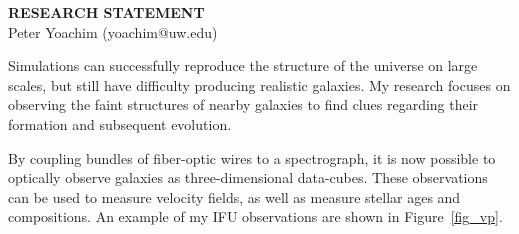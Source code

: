 \documentclass[letterpaper, 11pt]{article}
\begin{document}
\thispagestyle{fancy}
\lhead{}
\rhead{}
\renewcommand{\headrulewidth}{0pt} 
\renewcommand{\footrulewidth}{0pt} 
\fancyfoot[C]{\footnotesize \textcolor{gray}{http://staff.washington.edu/yoachim/}} 


\pagestyle{fancy}
\lhead{\textcolor{gray}{\it Peter Yoachim}}
\rhead{\textcolor{gray}{\thepage/\totalpages{}}}


\begin{center}
{\Large \bf RESEARCH STATEMENT}\\
\vspace*{0.1cm}
{\normalsize Peter Yoachim (yoachim@uw.edu)}
\end{center}



Simulations can successfully reproduce the structure of the universe on large scales, but still have difficulty producing realistic galaxies.  My research focuses on observing the faint structures of nearby galaxies to find clues regarding their formation and subsequent evolution.   \\





By coupling bundles of fiber-optic wires to a spectrograph, it is now possible to optically observe galaxies as three-dimensional data-cubes.  These observations can be used to measure velocity fields, as well as measure stellar ages and compositions.  An example of my IFU observations are shown in Figure~\ref{fig_vp}.
\end{document}
